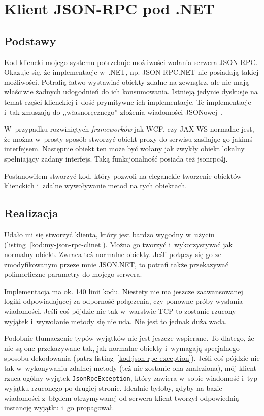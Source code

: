 \section{Klient JSON-RPC pod .NET}
\subsection{Podstawy}
Kod kliencki mojego systemu potrzebuje możliwości wołania serwera JSON-RPC.
Okazuje się, że implementacje w~.NET, np. JSON-RPC.NET nie posiadają takiej możliwości.
Potrafią łatwo wystawiać obiekty zdalne na zewnątrz, ale nie mają właściwie żadnych udogodnień do ich konsumowania.
Istnieją jedynie dyskusje na temat części klienckiej i~dość prymitywne ich implementacje.
Te implementacje i~tak zmuszają do ,,własnoręcznego'' złożenia wiadomości JSONowej~\cite{json-rpc-net-client}.

W~przypadku rozwiniętych \emph{frameworków} jak WCF, czy JAX-WS normalne jest, że można w~prosty sposób stworzyć obiekt proxy do serwisu zasilając go jakimś interfejsem.
Następnie obiekt ten może być wołany jak zwykły obiekt lokalny spełniający zadany interfejs.
Taką funkcjonalność posiada też jsonrpc4j.

Postanowiłem stworzyć kod, który pozwoli na eleganckie tworzenie obiektów klienckich i~zdalne wywoływanie metod na tych obiektach.

\subsection{Realizacja}
Udało mi się stworzyć klienta, który jest bardzo wygodny w~użyciu (listing~\ref{kod:my-json-rpc-clinet}).
Można go tworzyć i~wykorzystywać jak normalny obiekt. Zwraca też normalne obiekty.
Jeśli połączy się go ze zmodyfikowanym przeze mnie JSON.NET, to potrafi także przekazywać polimorficzne parametry do mojego serwera.


Implementacja ma ok. 140 linii kodu.
Niestety nie ma jeszcze zaawansowanej logiki odpowiadającej za odporność połączenia, czy ponowne próby wysłania wiadomości. Jeśli coś pójdzie nie tak w~warstwie TCP to zostanie rzucony wyjątek i~wywołanie metody się nie uda.
Nie jest to jednak duża wada.

Podobnie tłumaczenie typów wyjątków nie jest jeszcze wspierane.
To dlatego, że nie są one przekazywane tak, jak normalne obiekty i~wymagają specjalnego sposobu dekodowania (patrz listing~\ref{kod:json-rpc-exception}).
Jeśli coś pójdzie nie tak w~wykonywaniu zdalnej metody (też nie zostanie ona znaleziona), mój klient rzuca ogólny wyjątek \texttt{JsonRpcException}, który zawiera w~sobie wiadomość i~typ wyjątku rzuconego po drugiej stronie.
Idealnie byłoby, gdyby na bazie wiadomości z~błędem otrzymywanej od serwera klient tworzył odpowiednią instancję wyjątku i~go propagował.

